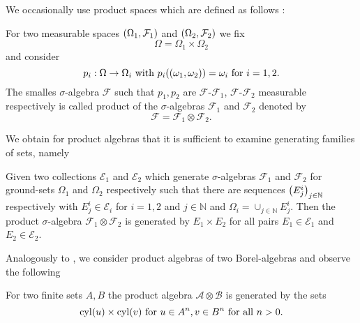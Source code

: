 We occasionally use product spaces which are defined as follows 
\cite[Chapter 22]{Bauer}:
\begin{definition}
  For two measurable spaces $\left(\Omega_{1}, \mathcal{F}_{1}\right)$ and 
  $\left(\Omega_{2}, \mathcal{F}_{2}\right)$ we fix
  \begin{equation*}
    \Omega = \Omega_{1}\times\Omega_{2}
  \end{equation*}
  and consider
  \begin{equation*}
    p_{i}:\Omega\rightarrow\Omega_{i}\text{ with }
      p_{i}(\left(\omega_{1}, \omega_{2}\right)) = \omega_{i}\text{ for }i = 1,2.
  \end{equation*}
  The smalles $\sigma$-algebra $\mathcal{F}$ such that $p_{1}, p_{2}$ are 
  $\mathcal{F}$-$\mathcal{F}_{1}$, $\mathcal{F}$-$\mathcal{F}_{2}$ measurable 
  respectively is called product of the $\sigma$-algebras $\mathcal{F}_{1}$ and
  $\mathcal{F}_{2}$ denoted by
  \begin{equation*}
    \mathcal{F} = \mathcal{F}_{1}\otimes\mathcal{F}_{2}.
  \end{equation*}
\end{definition}
We obtain for product algebras that it is sufficient to examine generating
families of sets, namely
\begin{theorem}
  \cite[Theorem 22.1]{Bauer}
  Given two collections $\mathcal{E}_{1}$ and $\mathcal{E}_{2}$ which 
  generate $\sigma$-algebras $\mathcal{F}_{1}$ and $\mathcal{F}_{2}$ for 
  ground-sets $\Omega_{1}$ and $\Omega_{2}$ respectively such that there are
  sequences $\left(E^{i}_{j}\right)_{j\in\mathbb{N}}$ respectively with 
  $E^{i}_{j}\in\mathcal{E}_{i}$ for $i = 1,2$ and $j\in\mathbb{N}$ and 
  $\Omega_{i} = \cup_{j\in\mathbb{N}}E_{j}^{i}$. Then the product 
  $\sigma$-algebra $\mathcal{F}_{1}\otimes\mathcal{F}_{2}$ is generated by 
  $E_{1}\times E_{2}$ for all pairs $E_{1}\in\mathcal{E}_{1}$ and 
  $E_{2}\in\mathcal{E}_{2}$. 
  \label{thm:productgen}
\end{theorem}
Analogously to \cite[Remark 35]{AutoRandInfTrees}, we consider product algebras
of two Borel-algebras and observe the following
\begin{lemma}
  For two finite sets $A, B$ the product algebra
  $\mathcal{A}\otimes\mathcal{B}$ is generated by the sets
  \begin{equation*}
    \operatorname{cyl}(u)\times\operatorname{cyl}(v)\text{ for }u\in A^{n}, v\in B^{n}\text{ for all }n>0.
  \end{equation*}
  \label{lem:productborelalgebras}
\end{lemma}
